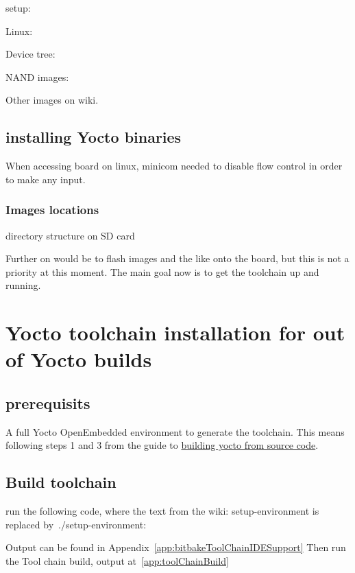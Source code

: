 \documentclass[10pt]{article}
\begin{document}
setup:

Linux:

Device tree:

NAND images:


Other images on wiki.

\subsection{installing Yocto binaries}
When accessing board on linux, minicom needed to disable flow control in order to make any input.

\subsubsection{Images locations}
directory structure on SD card


Further on would be to flash images and the like onto the board, but this is not a priority at this moment.
The main goal now is to get the toolchain up and running.


\section{Yocto toolchain installation for out of Yocto builds}
\subsection{prerequisits}
A full Yocto OpenEmbedded environment to generate the toolchain. This means following steps 1 and 3 from the guide to
\href{http://variwiki.com/index.php?title=Yocto\_Build\_Release&release=RELEASE\_SUMO\_V1.1\_VAR-SOM-MX6}{building yocto from source code}.


\subsection{Build toolchain}%
run the following code, where the text from the wiki: setup-environment is replaced by~./setup-environment:

Output can be found in Appendix~\ref{app:bitbakeToolChainIDESupport}
Then run the Tool chain build, output at~\ref{app:toolChainBuild}
\end{document}
